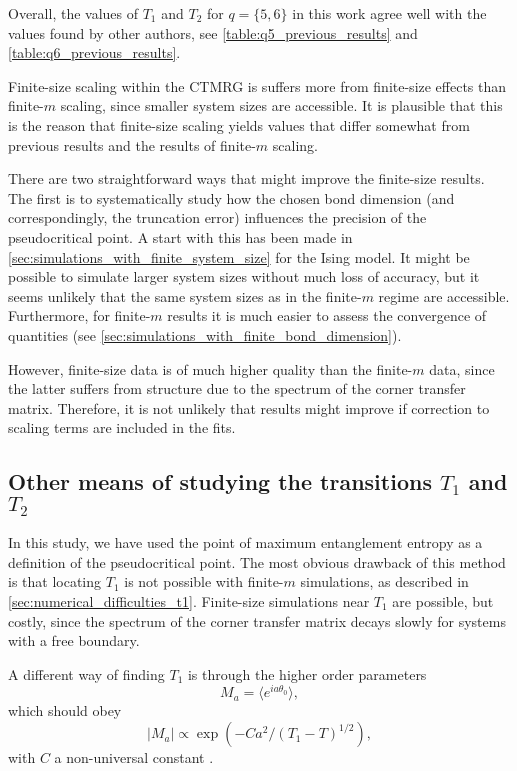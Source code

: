 Overall, the values of $T_1$ and $T_2$ for $q = \{ 5, 6 \}$ in this work agree well with the values found by other
authors, see \autoref{table:q5_previous_results} and \autoref{table:q6_previous_results}.

Finite-size scaling within the CTMRG is suffers more from finite-size effects than finite-$m$ scaling,
since smaller system sizes are accessible.
It is plausible that this is the reason that finite-size scaling yields values that differ somewhat from previous
results and the results of finite-$m$ scaling.

There are two straightforward ways that might improve the finite-size results.
The first is to systematically study how the chosen bond dimension (and correspondingly,
the truncation error) influences the precision of the pseudocritical point.
A start with this has been made in \autoref{sec:simulations_with_finite_system_size} for the Ising model.
It might be possible to simulate larger system sizes without much loss of accuracy,
but it seems unlikely that the same system sizes as in the finite-$m$ regime are accessible.
Furthermore, for finite-$m$ results it is much easier to assess the convergence of quantities (see
\autoref{sec:simulations_with_finite_bond_dimension}).

However, finite-size data is of much higher quality than the finite-$m$ data,
since the latter suffers from structure due to the spectrum of the corner transfer matrix.
Therefore, it is not unlikely that results might improve if correction to scaling terms are included in the fits.

\subsection{Other means of studying the transitions $T_1$ and $T_2$}

In this study, we have used the point of maximum entanglement entropy as a definition of the pseudocritical point.
The most obvious drawback of this method is that locating $T_1$ is not possible with finite-$m$ simulations,
as described in \autoref{sec:numerical_difficulties_t1}.
Finite-size simulations near $T_1$ are possible, but costly, since the spectrum of the corner transfer matrix decays
slowly for systems with a free boundary.

A different way of finding $T_1$ is through the higher order parameters
\begin{equation}
  M_a = \langle e^{i a \theta_0 } \rangle,
\end{equation}
which should obey
\begin{equation}
  |M_a| \propto \exp \left(-Ca^2 / (T_1 - T)^{1/2} \right),
\end{equation}
with $C$ a non-universal constant \cite{cardy1980general}.

